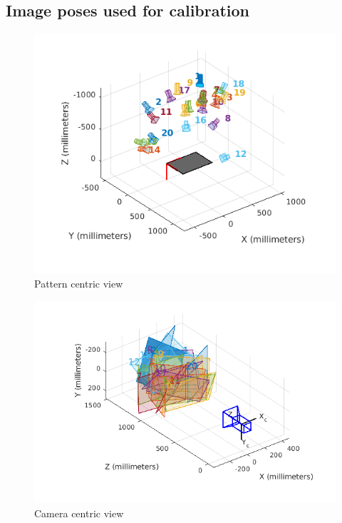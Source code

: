 \documentclass[11pt,a4paper]{article}
\begin{document}
\subsection{Image poses used for calibration}
\begin{figure}[H]
\includegraphics[scale=0.7]{pattern_centric_view.png}
\caption{Pattern centric view}
\end{figure}

\begin{figure}[H]
\includegraphics[scale=0.7]{camera_centric_view.png}
\caption{Camera centric view}
\end{figure}
\end{document}
